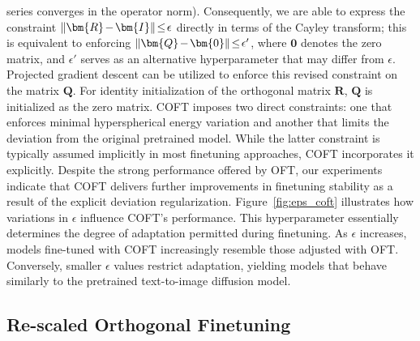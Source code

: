 series converges in the operator norm). Consequently, we are able to express the constraint $\thickmuskip=2mu \medmuskip=2mu\|\bm{R}-\bm{I}\|\leq\epsilon$ directly in terms of the Cayley transform; this is equivalent to enforcing $\thickmuskip=2mu \medmuskip=2mu \|\bm{Q}-\bm{0}\|\leq\epsilon'$, where $\bm{0}$ denotes the zero matrix, and $\epsilon'$ serves as an alternative hyperparameter that may differ from $\epsilon$. Projected gradient descent can be utilized to enforce this revised constraint on the matrix $\bm{Q}$. For identity initialization of the orthogonal matrix $\bm{R}$, $\bm{Q}$ is initialized as the zero matrix. COFT imposes two direct constraints: one that enforces minimal hyperspherical energy variation and another that limits the deviation from the original pretrained model. While the latter constraint is typically assumed implicitly in most finetuning approaches, COFT incorporates it explicitly. Despite the strong performance offered by OFT, our experiments indicate that COFT delivers further improvements in finetuning stability as a result of the explicit deviation regularization. Figure~\ref{fig:eps_coft} illustrates how variations in $\epsilon$ influence COFT's performance. This hyperparameter essentially determines the degree of adaptation permitted during finetuning. As $\epsilon$ increases, models fine-tuned with COFT increasingly resemble those adjusted with OFT. Conversely, smaller $\epsilon$ values restrict adaptation, yielding models that behave similarly to the pretrained text-to-image diffusion model.

\subsection{Re-scaled Orthogonal Finetuning}

